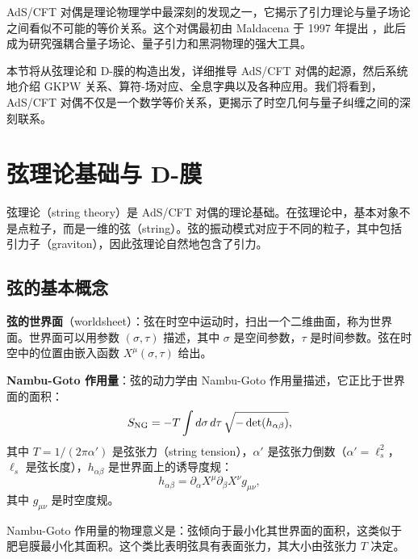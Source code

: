 
AdS/CFT 对偶是理论物理学中最深刻的发现之一，它揭示了引力理论与量子场论之间看似不可能的等价关系。这个对偶最初由 Maldacena 于 1997 年提出 \cite{Maldacena1997}，此后成为研究强耦合量子场论、量子引力和黑洞物理的强大工具。

本节将从弦理论和 D-膜的构造出发，详细推导 AdS/CFT 对偶的起源，然后系统地介绍 GKPW 关系、算符-场对应、全息字典以及各种应用。我们将看到，AdS/CFT 对偶不仅是一个数学等价关系，更揭示了时空几何与量子纠缠之间的深刻联系。

\section{弦理论基础与 D-膜}

弦理论（string theory）是 AdS/CFT 对偶的理论基础。在弦理论中，基本对象不是点粒子，而是一维的弦（string）。弦的振动模式对应于不同的粒子，其中包括引力子（graviton），因此弦理论自然地包含了引力。

\subsection{弦的基本概念}

\textbf{弦的世界面}（worldsheet）：弦在时空中运动时，扫出一个二维曲面，称为世界面。世界面可以用参数 $(\sigma, \tau)$ 描述，其中 $\sigma$ 是空间参数，$\tau$ 是时间参数。弦在时空中的位置由嵌入函数 $X^\mu(\sigma, \tau)$ 给出。

\textbf{Nambu-Goto 作用量}：弦的动力学由 Nambu-Goto 作用量描述，它正比于世界面的面积：
\begin{equation}
    S_{\rm NG} = -T \int d\sigma \, d\tau \, \sqrt{-\det(h_{\alpha\beta})},
\end{equation}
其中 $T = 1/(2\pi\alpha')$ 是弦张力（string tension），$\alpha'$ 是弦张力倒数（$\alpha' = \ell_s^2$，$\ell_s$ 是弦长度），$h_{\alpha\beta}$ 是世界面上的诱导度规：
\begin{equation}
    h_{\alpha\beta} = \partial_\alpha X^\mu \partial_\beta X^\nu g_{\mu\nu},
\end{equation}
其中 $g_{\mu\nu}$ 是时空度规。

\begin{note}
Nambu-Goto 作用量的物理意义是：弦倾向于最小化其世界面的面积，这类似于肥皂膜最小化其面积。这个类比表明弦具有表面张力，其大小由弦张力 $T$ 决定。
\end{note}

